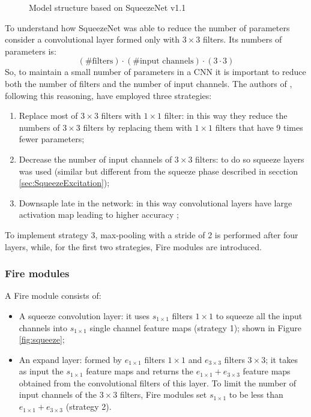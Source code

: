 \begin{figure}[H]
    \vspace{0.8em}
    \centering
    \resizebox{.4\textwidth}{!}{}
    \caption{Model structure based on SqueezeNet v1.1 \label{fig:squeezeDiag}}
\end{figure}

\noindent
To understand how SqueezeNet was able to reduce the number of parameters consider a convolutional layer
formed only with $3\!\times\!3$ filters. Its numbers of parameters is:
$$ (\text{\# filters})\cdot(\text{\# input channels})\cdot(3\cdot 3) $$
So, to maintain a small number of parameters in a CNN it is important to reduce both the number of filters
and the number of input channels.
The authors of \cite{iandola2016squeezenetalexnetlevelaccuracy50x}, following this reasoning, have employed
three strategies:

\begin{enumerate}
    \item Replace most of $3\!\times\!3$ filters with $1\!\times\!1$ filter: in this way they reduce the numbers 
    of $3\!\times\!3$ filters by replacing them with $1\!\times\!1$ filters that have 9 times fewer parameters;
    \item Decrease the number of input channels of $\!3\times\!3$ filters: to do so squeeze layers was used 
    (similar but different from the squeeze phase described in secction \ref{sec:SqueezeExcitation});
    \item Downsaple late in the network: in this way convolutional layers have large activation map
        leading to higher accuracy \cite{he2014convolutionalneuralnetworksconstrained}; 
\end{enumerate}
\noindent

To implement strategy 3, max-pooling with a stride of 2 is performed after four layers, while, for the first two
strategies, Fire modules are introduced.

\subsubsection{Fire modules}\label{sec:fire}
A Fire module consists of:
\begin{itemize}
    \item A squeeze convolution layer: it uses $s_{1\!\times\!1}$ filters $1\!\times\!1$ to squeeze all
        the input channels into $s_{1\!\times\!1}$ single channel feature maps (strategy 1); shown in Figure 
        \ref{fig:squeeze};
    \item An expand layer: formed by $e_{1\!\times\!1}$ filters $1\!\times\!1$ and $e_{3\!\times\!3}$ 
        filters $3\!\times\!3$; it takes as input the $s_{1\!\times\!1}$ feature maps and returns the
        $e_{1\!\times\!1}+e_{3\!\times\!3}$ feature maps obtained from the convolutional filters of this 
        layer. To limit the number of input channels of the $3\!\times\!3$ filters, Fire modules set 
        $s_{1\!\times\!1}$ to be less than $e_{1\!\times\!1}+e_{3\!\times\!3}$ (strategy 2).
\end{itemize}

